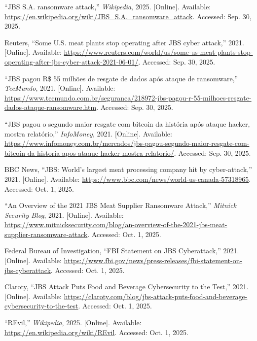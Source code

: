 \documentclass[conference]{IEEEtran}
\begin{document}
\begin{thebibliography}{00}

``JBS S.A. ransomware attack,'' \emph{Wikipedia}, 2025. [Online]. Available: \url{https://en.wikipedia.org/wiki/JBS_S.A._ransomware_attack}. Accessed: Sep. 30, 2025.

Reuters, ``Some U.S. meat plants stop operating after JBS cyber attack,'' 2021. [Online]. Available: \url{https://www.reuters.com/world/us/some-us-meat-plants-stop-operating-after-jbs-cyber-attack-2021-06-01/}. Accessed: Sep. 30, 2025.

``JBS pagou R\$ 55 milhões de resgate de dados após ataque de ransomware,'' \emph{TecMundo}, 2021. [Online]. Available: \url{https://www.tecmundo.com.br/seguranca/218972-jbs-pagou-r-55-milhoes-resgate-dados-ataque-ransomware.htm}. Accessed: Sep. 30, 2025.

``JBS pagou o segundo maior resgate com bitcoin da história após ataque hacker, mostra relatório,'' \emph{InfoMoney}, 2021. [Online]. Available: \url{https://www.infomoney.com.br/mercados/jbs-pagou-segundo-maior-resgate-com-bitcoin-da-historia-apos-ataque-hacker-mostra-relatorio/}. Accessed: Sep. 30, 2025.

BBC News, ``JBS: World's largest meat processing company hit by cyber-attack,'' 2021. [Online]. Available: \url{https://www.bbc.com/news/world-us-canada-57318965}. Accessed: Oct. 1, 2025.

``An Overview of the 2021 JBS Meat Supplier Ransomware Attack,'' \emph{Mitnick Security Blog}, 2021. [Online]. Available: \url{https://www.mitnicksecurity.com/blog/an-overview-of-the-2021-jbs-meat-supplier-ransomware-attack}. Accessed: Oct. 1, 2025.

Federal Bureau of Investigation, ``FBI Statement on JBS Cyberattack,'' 2021. [Online]. Available: \url{https://www.fbi.gov/news/press-releases/fbi-statement-on-jbs-cyberattack}. Accessed: Oct. 1, 2025.

Claroty, ``JBS Attack Puts Food and Beverage Cybersecurity to the Test,'' 2021. [Online]. Available: \url{https://claroty.com/blog/jbs-attack-puts-food-and-beverage-cybersecurity-to-the-test}. Accessed: Oct. 1, 2025.

``REvil,'' \emph{Wikipedia}, 2025. [Online]. Available: \url{https://en.wikipedia.org/wiki/REvil}. Accessed: Oct. 1, 2025.

\end{thebibliography}
\end{document}
